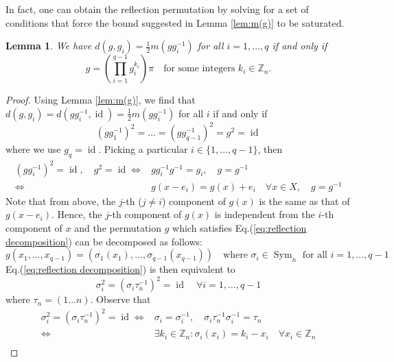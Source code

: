\documentclass[11pt,oneside,letterpaper]{article}
\numberwithin{equation}{section}
\newtheorem{lemma}[theorem]{Lemma}
\theoremstyle{definition}
\theoremstyle{remark}
\DeclareMathOperator{\id}{id}
\DeclareMathOperator{\Sym}{Sym}
\begin{document}
In fact, one can obtain the reflection permutation by solving for a set of conditions that force the bound suggested in Lemma \ref{lem:m(g)} to be saturated.
\begin{lemma}
  We have $d(g, g_i) = \frac{1}{2}m(gg_i^{-1})$ for all $i=1, \dots, q$ if and only if
  \begin{equation}
    g=\left(\prod_{i=1}^{q-1}g_i^{k_i}\right)\pi \quad \text{for some integers $k_i\in \mathbb{Z}_n$}.
  \end{equation}
\end{lemma}
\begin{proof}
  Using Lemma \ref{lem:m(g)}, we find that $d(g, g_i)=d(gg_i^{-1}, \id)=\frac{1}{2}m(gg_i^{-1})$ for all $i$ if and only if
  \begin{equation}\label{eq:reflection decomposition}
    (gg_1^{-1})^2 = \dots = (gg_{q-1}^{-1})^2 = g^2 = \id
  \end{equation}
  where we use $g_q=\id$. Picking a particular $i\in\{1, \dots, q-1\}$, then
  \begin{equation}
    \begin{split}
      (gg_i^{-1})^2=\id, \quad g^2=\id \iff & gg_i^{-1}g^{-1} = g_i, \quad g=g^{-1} \\
      \iff & g(x-e_i) = g(x)+e_i \quad \forall x\in X, \quad g=g^{-1}
    \end{split}
  \end{equation}
  Note that from above, the $j$-th ($j\neq i$) component of $g(x)$ is the same as that of $g(x-e_i)$. Hence, the $j$-th component of $g(x)$ is independent from the $i$-th component of $x$ and the permutation $g$ which satisfies Eq.(\ref{eq:reflection decomposition}) can be decomposed as follows:
  \begin{equation}
    g(x_1, \dots, x_{q-1}) = (\sigma_1(x_1), \dots, \sigma_{q-1}(x_{q-1})) \quad \text{where $\sigma_i\in \Sym_n$ for all $i=1, \dots, q-1$}
  \end{equation}
  Eq.(\ref{eq:reflection decomposition}) is then equivalent to
  \begin{equation}
    \sigma_i^{2} = (\sigma_i\tau_n^{-1})^2=\id\quad \forall i=1, \dots, q-1
  \end{equation}
  where $\tau_n=(1\dots n)$. Observe that
  \begin{equation}
    \begin{split}
      \sigma_i^{2} = (\sigma_i\tau_n^{-1})^2=\id \iff & \sigma_i = \sigma_i^{-1}, \quad\sigma_i\tau_n^{-1}\sigma_i^{-1}=\tau_n \\
      \iff & \exists k_i\in \mathbb{Z}_n: \sigma_i(x_i) = k_i - x_i \quad \forall x_i\in\mathbb{Z}_n \\

\end{split}
\end{equation}
\end{proof}
\end{document}
